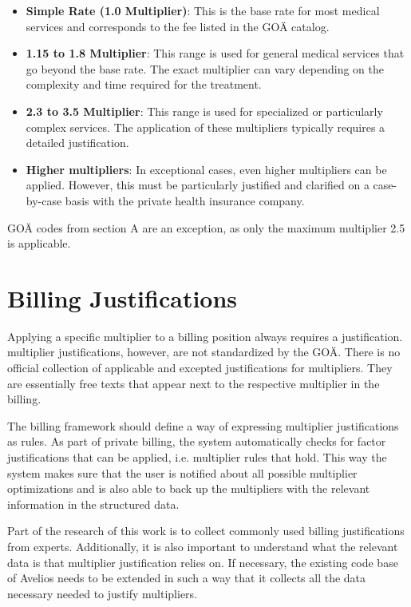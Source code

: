 \begin{itemize}
    \item \textbf{Simple Rate (1.0 Multiplier)}: This is the base rate for most medical services and corresponds to the fee listed in the GOÄ catalog.
    \item \textbf{1.15 to 1.8 Multiplier}: This range is used for general medical services that go beyond the base rate.
    The exact multiplier can vary depending on the complexity and time required for the treatment.
    \item \textbf{2.3 to 3.5 Multiplier}: This range is used for specialized or particularly complex services.
    The application of these multipliers typically requires a detailed justification.
    \item \textbf{Higher multipliers}: In exceptional cases, even higher multipliers can be applied.
    However, this must be particularly justified and clarified on a case-by-case basis with the private health insurance company.
\end{itemize}

GOÄ codes from section A are an exception, as only the maximum multiplier 2.5 is applicable\cite[]{hermanns2011gebuhrenordnung}.


\section{Billing Justifications}\label{sec:billing-justifications}

Applying a specific multiplier to a billing position always requires a justification.
multiplier justifications, however, are not standardized by the GOÄ\cite[]{bruck1998kommentar}.
There is no official collection of applicable and excepted justifications for multipliers.
They are essentially free texts that appear next to the respective multiplier in the billing.


The billing framework should define a way of expressing multiplier justifications as rules.
As part of private billing, the system automatically checks for factor justifications that can be applied, i.e. multiplier rules that hold.
This way the system makes sure that the user is notified about all possible multiplier optimizations and is also able to back up the multipliers with the relevant information in the structured data.

Part of the research of this work is to collect commonly used billing justifications from experts.
Additionally, it is also important to understand what the relevant data is that multiplier justification relies on.
If necessary, the existing code base of Avelios needs to be extended in such a way that it collects all the data necessary needed to justify multipliers.

